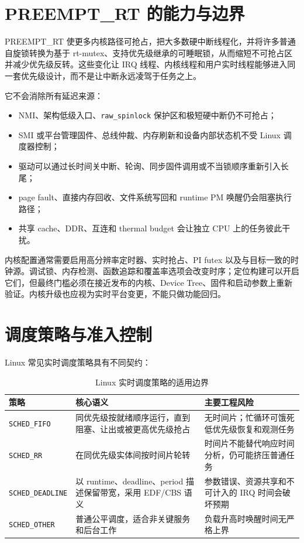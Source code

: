 \section{PREEMPT\_RT 的能力与边界}

PREEMPT\_RT 使更多内核路径可抢占，把大多数硬中断线程化，并将许多普通自旋锁转换为基于 rt-mutex、支持优先级继承的可睡眠锁，从而缩短不可抢占区并减少优先级反转\cite{linux-preempt-rt,linux-rt-mutex}。这些变化让 IRQ 线程、内核线程和用户实时线程能够进入同一套优先级设计，而不是让中断永远凌驾于任务之上。

它不会消除所有延迟来源：

\begin{itemize}
  \item NMI、架构低级入口、\texttt{raw\_spinlock} 保护区和极短硬中断仍不可抢占；
  \item SMI 或平台管理固件、总线仲裁、内存刷新和设备内部状态机不受 Linux 调度器控制；
  \item 驱动可以通过长时间关中断、轮询、同步固件调用或不当锁顺序重新引入长尾；
  \item page fault、直接内存回收、文件系统写回和 runtime PM 唤醒仍会阻塞执行路径；
  \item 共享 cache、DDR、互连和 thermal budget 会让独立 CPU 上的任务彼此干扰。
\end{itemize}

内核配置通常需要启用高分辨率定时器、实时抢占、PI futex 以及与目标一致的时钟源。调试锁、内存检测、函数追踪和覆盖率选项会改变时序；定位构建可以开启它们，但最终门槛必须在接近发布的内核、Device Tree、固件和启动参数上重新验证。内核升级也应视为实时平台变更，不能只做功能回归。

\section{调度策略与准入控制}

Linux 常见实时调度策略具有不同契约：

\begin{table}[H]
  \centering
  \caption{Linux 实时调度策略的适用边界}
  \begin{tabular}{p{28mm}p{45mm}p{56mm}}
    \hline
    策略 & 核心语义 & 主要工程风险 \\
    \hline
    \texttt{SCHED\_FIFO} & 同优先级按就绪顺序运行，直到阻塞、让出或被更高优先级抢占 & 无时间片；忙循环可饿死低优先级恢复和观测任务 \\
    \texttt{SCHED\_RR} & 在同优先级实体间按时间片轮转 & 时间片不能替代响应时间分析，仍可能挤压普通任务 \\
    \texttt{SCHED\_DEADLINE} & 以 runtime、deadline、period 描述保留带宽，采用 EDF/CBS 语义 & 参数错误、资源共享和不可计入的 IRQ 时间会破坏预期 \\
    \texttt{SCHED\_OTHER} & 普通公平调度，适合非关键服务和后台工作 & 负载升高时唤醒时间无严格上界 \\
    \hline
  \end{tabular}
\end{table}

